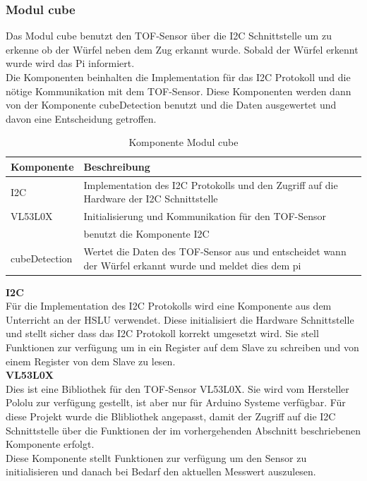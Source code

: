 \documentclass[../../main.tex]{subfiles}
\begin{document}
    \subsubsection{Modul cube} \label{et_software_tiny_cube}
    Das Modul cube benutzt den TOF-Sensor über die I2C Schnittstelle um zu erkenne ob der Würfel neben dem Zug erkannt wurde. Sobald der Würfel erkennt wurde wird das Pi informiert.\\
    Die Komponenten beinhalten die Implementation für das I2C Protokoll und die nötige Kommunikation mit dem TOF-Sensor. Diese Komponenten werden dann von der Komponente cubeDetection benutzt und die Daten ausgewertet und davon eine Entscheidung getroffen.

    \begin{table}[H]
        \centering
        \begin{tabular}{|l|p{12cm}|}
        \hline
        \textbf{Komponente} & \textbf{Beschreibung}    \\ \hline
        I2C     & Implementation des I2C Protokolls und den Zugriff auf die Hardware der I2C Schnittstelle \\ \hline
        VL53L0X & Initialisierung und Kommunikation für den TOF-Sensor \\ & benutzt die Komponente I2C \\ \hline
        cubeDetection & Wertet die Daten des TOF-Sensor aus und entscheidet wann der Würfel erkannt wurde und meldet dies dem pi \\ \hline
        \end{tabular}
        \caption{Komponente Modul cube}
        \label{tab:et_mc_cube}
    \end{table}

    \textbf{I2C}\\
    Für die Implementation des I2C Protokolls wird eine Komponente aus dem Unterricht an der HSLU verwendet. Diese initialisiert die Hardware Schnittstelle und stellt sicher dass das I2C Protokoll korrekt umgesetzt wird. Sie stell Funktionen zur verfügung um in ein Register auf dem Slave zu schreiben und von einem Register von dem Slave zu lesen.\\

    \textbf{VL53L0X}\\
    Dies ist eine Bibliothek für den TOF-Sensor VL53L0X. Sie wird vom Hersteller Pololu zur verfügung gestellt, ist aber nur für Arduino Systeme verfügbar. Für diese Projekt wurde die Blibliothek angepasst, damit der Zugriff auf die I2C Schnittstelle über die Funktionen der im vorhergehenden Abschnitt beschriebenen Komponente erfolgt. \\
    Diese Komponente stellt Funktionen zur verfügung um den Sensor zu initialisieren und danach bei Bedarf den aktuellen Messwert auszulesen.\\
\end{document}
